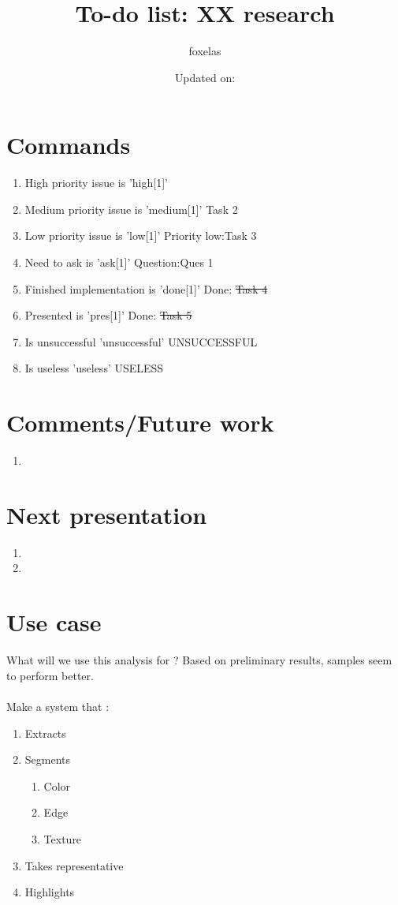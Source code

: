 \documentclass[11pt]{article}
\title{\vspace{-3.0cm} To-do list: XX research}
\author[1]{foxelas}
\date{Updated on: \color{magenta}{\today}}
\newcommand{\high}[1]{{\color{BrickRed}{Priority high: #1}}}
\newcommand{\medium}[1]{{\color{Periwinkle}{Priority medium:}}#1}
\newcommand{\low}[1]{Priority low:{#1}}
\newcommand{\ask}[1]{{\color{NavyBlue}Question:}{#1}}
\newcommand{\done}[1]{{\color{WildStrawberry}Done:} \sout{#1} }
\newcommand{\paint}[1]{{\color{TealBlue}#1}}
\newcommand{\unsuccessful}{{\color{BurntOrange}UNSUCCESSFUL }}
\newcommand{\useless}{{\color{Mahogany}USELESS }}
\begin{document}
\setcounter{page}{1}

\maketitle
\section{Commands}
\begin{enumerate}
\item High priority issue is 'high[1]' \high{Task 1}
\item Medium priority issue is 'medium[1]' \medium{Task 2}
\item Low priority issue is 'low[1]' \low{Task 3}
\item Need to ask is 'ask[1]' \ask{Ques 1}
\item Finished implementation is 'done[1]' \done{Task 4}
\item Presented is 'pres[1]' \done{Task 5}
\item Is unsuccessful 'unsuccessful' \unsuccessful 
\item Is useless 'useless' \useless
\end{enumerate}

\section{Comments/Future work}
\begin{enumerate}
\item  
\end{enumerate}


\section{Next presentation} 
\begin{enumerate} 
\item \blindtext
\item \blindtext
\end{enumerate}

\section{Use case}
What will we use this analysis for ?
Based on preliminary results, samples seem to perform better.\\
 \paint{\blindtext} \\
Make a system that :
\begin{enumerate}
\item Extracts 
\item Segments 
\begin{enumerate}[label=(\alph*)]
\item Color
\item Edge
\item Texture
\end{enumerate} 
\item Takes representative 
\item Highlights
\end{enumerate}
\end{document}
